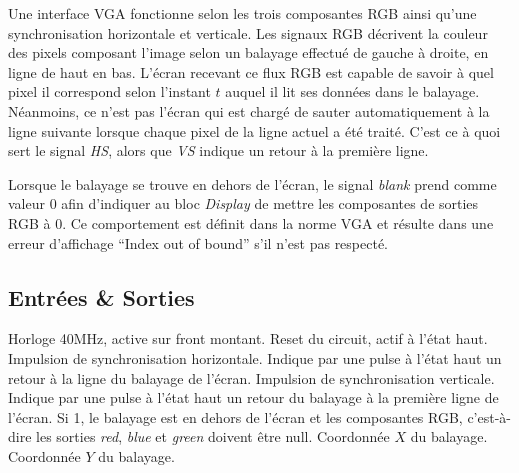 \documentclass[french]{nakrule}
\begin{document}
Une interface VGA fonctionne selon les trois composantes RGB ainsi qu’une
synchronisation horizontale et verticale. Les signaux RGB décrivent
la couleur des pixels composant l’image selon un balayage effectué de gauche à
droite, en ligne de haut en bas. L’écran recevant ce flux RGB est capable de
savoir à quel pixel il correspond selon l’instant $t$ auquel il lit ses données
dans le balayage. Néanmoins, ce n’est pas l’écran qui est chargé de sauter
automatiquement à la ligne suivante lorsque chaque pixel de la ligne actuel a
été traité. C’est ce à quoi sert le signal \emph{HS}, alors que \emph{VS} indique un retour à
la première ligne.


Lorsque le balayage se trouve en dehors de l'écran, le signal \emph{blank} prend
comme valeur 0 afin d'indiquer au bloc \emph{Display} de mettre les composantes
de sorties RGB à 0. Ce comportement est définit dans la norme VGA et résulte
dans une erreur d'affichage ``Index out of bound'' s'il n'est pas respecté.

\subsection{Entrées \& Sorties}
\label{subsec:Entrées_Sorties_vga}

\begin{descr}
   Horloge 40MHz, active sur front montant.
   Reset du circuit, actif à l'état haut.
   Impulsion de synchronisation horizontale. Indique par une pulse
  à l'état haut un retour à la ligne du balayage de l'écran.
   Impulsion de synchronisation verticale. Indique par une pulse à
  l'état haut un retour du balayage à la première ligne de l'écran.
   Si 1, le balayage est en dehors de l'écran et les
  composantes RGB, c'est-à-dire les sorties \emph{red}, \emph{blue} et
  \emph{green} doivent être null.
   Coordonnée $X$ du balayage.
   Coordonnée $Y$ du balayage.
\end{descr}
\clearpage
\end{document}
